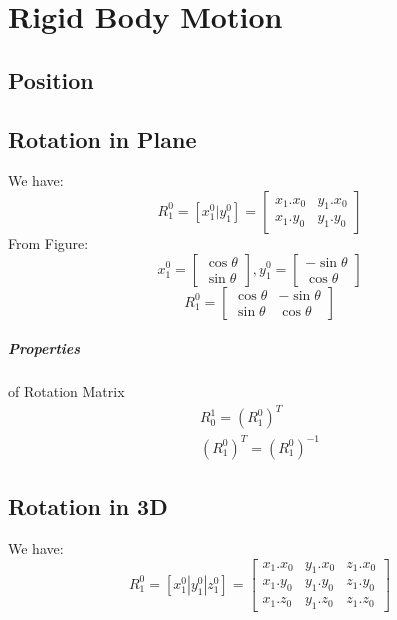 \chapter{Rigid Body Motion}
\section{Position}

\section{Rotation in Plane}
\begin{figure}[h]
	\centering
	
	\caption{}
	\label{}
\end{figure}
We have:
\begin{equation}
	R_1^0 = [x_1^0 | y_1^0] =
	\begin{bmatrix}
		x_1.x_0 & y_1.x_0 \\
		x_1.y_0 & y_1.y_0
	\end{bmatrix}
\end{equation}
From Figure:
\begin{equation}
	x_1^0 = 
	\begin{bmatrix}
		\cos \theta\\
		\sin \theta
	\end{bmatrix},
	y_1^0 = 
	\begin{bmatrix}
		-\sin \theta\\
		\cos \theta
	\end{bmatrix}
\end{equation}
\begin{equation}
	R_1^0 =
	\begin{bmatrix}
		\cos \theta & -\sin \theta \\
		\sin \theta & \cos \theta
	\end{bmatrix}
\end{equation}
\paragraph{Properties} of Rotation Matrix
\[
\begin{split}
	R_0^1 = (R_1^0)^T \\
	(R_1^0)^T = (R_1^0)^{-1}
\end{split}
\]


\section{Rotation in 3D}
We have:
\begin{equation}
	R_1^0 = [x_1^0 | y_1^0 | z_1^0] =
	\begin{bmatrix}
		x_1.x_0 & y_1.x_0 & z_1.x_0\\
		x_1.y_0 & y_1.y_0 & z_1.y_0\\
		x_1.z_0 & y_1.z_0 & z_1.z_0
	\end{bmatrix}
\end{equation}
